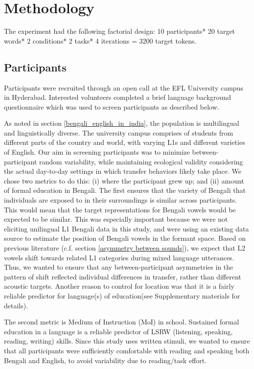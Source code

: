 \documentclass[12 pt]{article}
\begin{document}
\section{Methodology} \label{methodology}
The experiment had the following factorial design: 10 participants* 20 target words* 2 conditions* 2 tasks* 4 iterations = 3200 target tokens.

\subsection{Participants} \label{participants}
Participants were recruited through an open call at the EFL University campus in Hyderabad. Interested volunteers completed a brief language background questionnaire which was used to screen participants as described below. 

As noted in section \ref{bengali_english_in_india}, the population is multilingual and linguistically diverse. The university campus comprises of students from different parts of the country and world, with varying L1s and different varieties of English. Our aim in screening participants was to minimize between-participant random variability, while maintaining ecological validity considering the actual day-to-day settings in which transfer behaviors likely take place. We chose two metrics to do this: (i) where the participant grew up; and (ii) amount of formal education in Bengali. The first ensures that the variety of Bengali that individuals are exposed to in their surroundings is similar across participants. This would mean that the target representations for Bengali vowels would be expected to be similar. This was especially important because we were not eliciting unilingual L1 Bengali data in this study, and were using an existing data source to estimate the position of Bengali vowels in the formant space. Based on previous literature (c.f. section \ref{asymmetry between sounds}), we expect that L2 vowels shift towards related L1 categories during mixed language utterances. Thus, we wanted to ensure that any between-participant asymmetries in the pattern of shift reflected individual differences in transfer, rather than different acoustic targets. Another reason to control for location was that it is a fairly reliable predictor for language(s) of education(see Supplementary materials for details).

The second metric is Medium of Instruction (MoI) in school. Sustained formal education in a language is a reliable predictor of LSRW (listening, speaking, reading, writing) skills. Since this study uses written stimuli, we wanted to ensure that all participants were sufficiently comfortable with reading and speaking both Bengali and English, to avoid variability due to reading/task effort.  
\end{document}
